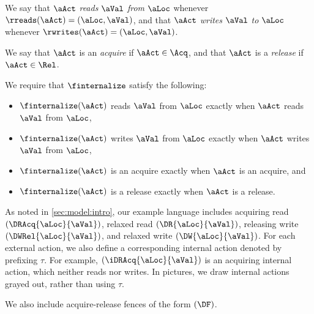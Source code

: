 We say that $\aAct$ \emph{reads} $\aVal$ \emph{from} $\aLoc$ whenever
$\rreads(\aAct) = (\aLoc,\aVal)$, and that $\aAct$ \emph{writes} $\aVal$
\emph{to} $\aLoc$ whenever $\rwrites(\aAct) = (\aLoc,\aVal)$.

We say that $\aAct$ is an \emph{acquire} if $\aAct\in\Acq$, and that $\aAct$
is a \emph{release} if $\aAct\in\Rel$.  

We require that $\finternalize$ satisfy the following:
\begin{itemize}
\item $\finternalize(\aAct)$ reads $\aVal$ from $\aLoc$ exactly when $\aAct$ reads $\aVal$ from $\aLoc$,
\item $\finternalize(\aAct)$ writes $\aVal$ from $\aLoc$ exactly when $\aAct$ writes $\aVal$ from $\aLoc$,
\item $\finternalize(\aAct)$ is an acquire exactly when $\aAct$ is an acquire, and 
\item $\finternalize(\aAct)$ is a release exactly when $\aAct$ is a release.
\end{itemize}

As noted in \textsection\ref{sec:model:intro}, our example language includes acquiring
read $(\DRAcq{\aLoc}{\aVal})$, relaxed read $(\DR{\aLoc}{\aVal})$, releasing
write $(\DWRel{\aLoc}{\aVal})$, and relaxed write $(\DW{\aLoc}{\aVal})$.
For each external action, we also define a corresponding internal action
denoted by prefixing $\tau$.
For example, $(\iDRAcq{\aLoc}{\aVal})$ is an acquiring internal action, which
neither reads nor writes. In pictures, we draw internal actions grayed out,
rather than using $\tau$.  %

We also include acquire-release fences of the form $(\DF)$.

